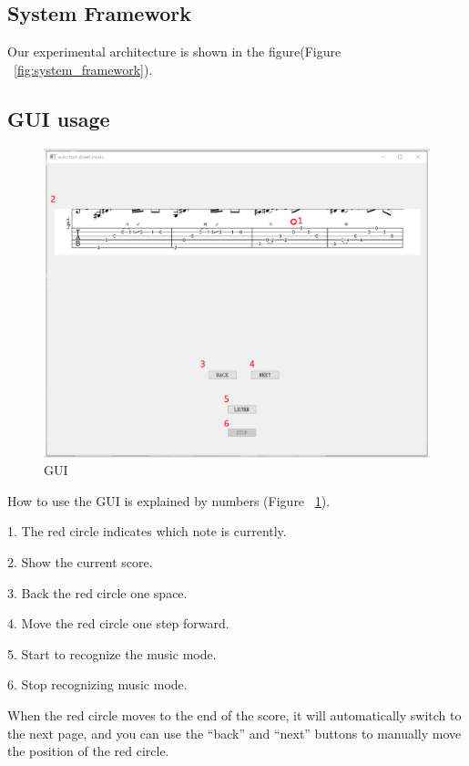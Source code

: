 \documentclass[10pt,twocolumn,letterpaper]{article}
\begin{document}
\begin{CJK}{UTF8}{bsmi}
\subsection{System Framework}

Our experimental architecture is shown in the figure(Figure ~\ref{fig:system_framework}).

\subsection{GUI usage}

\begin{figure}[t]
\begin{center}
   \includegraphics[width=0.8\linewidth]{gui.png}
\end{center}
   \caption{GUI}
\label{fig:gui}
\end{figure}

How to use the GUI is explained by numbers (Figure ~\ref{fig:gui}).

\begin{description}
\item 1. The red circle indicates which note is currently.
\item 2. Show the current score.
\item 3. Back the red circle one space.
\item 4. Move the red circle one step forward.
\item 5. Start to recognize the music mode.
\item 6. Stop recognizing music mode.
\end{description}

When the red circle moves to the end of the score, it will automatically switch to the next page, and you can use the “back” and “next” buttons to manually move the position of the red circle.


\end{CJK}
\end{document}
